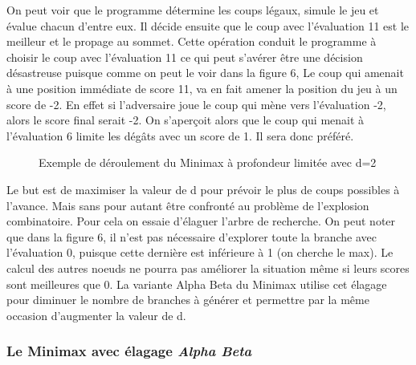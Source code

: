 \documentclass[11pt]{article}
\newcommand{\tmem}[1]{{\em #1\/}}
\begin{document}
On peut voir que le programme détermine les coups légaux, simule le
jeu et évalue chacun d'entre eux. Il décide ensuite que le coup avec
l'évaluation 11 est le meilleur et le propage au sommet. Cette
opération conduit le programme à choisir le coup avec l'évaluation
11 ce qui peut s'avérer être une décision désastreuse puisque
comme on peut le voir dans la figure 6, Le coup qui amenait à une position
immédiate de score 11, va en fait amener la position du jeu à un score
de -2. En effet si l'adversaire joue le coup qui mène vers
l'évaluation -2, alors le score final serait -2. On s'aper{\c c}oit alors
que le coup qui menait à l'évaluation 6 limite les dég{\^a}ts avec
un score de 1. Il sera donc préféré.

\begin{figure}[h]
  \caption {Exemple de déroulement du Minimax à profondeur limitée avec d=2}
\end{figure}

Le but est de maximiser la valeur de d pour prévoir le plus de coups
possibles à l'avance. Mais sans pour autant être confronté au
problème de l'explosion combinatoire. Pour cela on essaie d'élaguer
l'arbre de recherche. On peut noter que dans la figure 6, il n'est pas
nécessaire d'explorer toute la branche avec l'évaluation 0, puisque
cette dernière est inférieure à 1 (on cherche le max). Le calcul
des autres noeuds ne pourra pas améliorer la situation même si leurs
scores sont meilleures que 0. La variante Alpha Beta du Minimax utilise cet
élagage pour diminuer le nombre de branches à générer et
permettre par la même occasion d'augmenter la valeur de d.

\subsubsection{Le Minimax avec élagage {\tmem{Alpha Beta}}}
\end{document}
